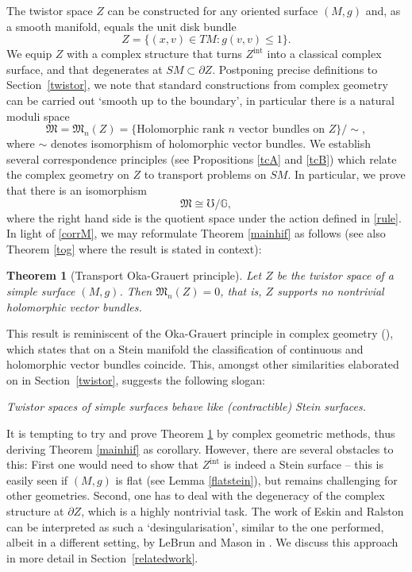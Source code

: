 \documentclass[JEP,XML,SOM,Unicode,published]{cedram}
\theoremstyle{plain}
\newtheorem{theorem}{Theorem}[section]
\theoremstyle{definition}
\newcommand{\G}{\mathbb{G}}
\newcommand{\M}{\mathfrak{M}}
\newcommand{\interior}{\mathrm{int}}
\newcommand{\1}{{\bf 1}}
\begin{document}
The twistor space $Z$ can be constructed for any oriented surface $(M,g)$ and, as a smooth manifold, equals the unit disk bundle
\begin{equation*}
Z=\{(x,v)\in TM:g(v,v)\le 1\}.
\end{equation*}
We equip $Z$ with a complex structure that turns $Z^{\interior}$ into a classical complex surface, and that degenerates at $SM\subset \partial Z$.
Postponing precise definitions to Section~\ref{twistor}, we note that standard constructions from complex geometry can be carried out `smooth up to the boundary', in particular there is a natural moduli space
\begin{equation*}
\M=\M_n(Z)=\{\text{Holomorphic rank } n \text{ vector bundles on } Z\}/\sim,
\end{equation*}
where $\sim$ denotes isomorphism of holomorphic vector bundles. We establish several correspondence principles (see Propositions \ref{tcA} and \ref{tcB}) which relate the complex geometry on $Z$ to transport problems on $SM$. In particular, we prove that there is an isomorphism
\begin{equation}\label{corrM}
\M \cong \mho / \G,
\end{equation}
where the right hand side is the quotient space under the action defined in \eqref{rule}. In light of \eqref{corrM}, we may reformulate Theorem \ref{mainhif} as follows (see also Theorem \ref{tog} where the result is stated in context):

\begin{theorem}[Transport Oka-Grauert principle]\label{maintog} Let $Z$ be the twistor space of a simple surface $(M,g)$. Then $\M_n(Z)=0$, that is, $Z$ supports no nontrivial holomorphic vector bundles.
\end{theorem}

This result is reminiscent of the Oka-Grauert principle in complex geometry (\cf \cite{Gra58,For11}), which states that on a Stein manifold the classification of continuous and holomorphic vector bundles coincide. This, amongst other similarities elaborated on in Section~\ref{twistor}, suggests the following slogan:
\begin{center}
\emph{Twistor spaces of simple surfaces behave like (contractible) Stein surfaces.}
\end{center}
It is tempting to try and prove Theorem \ref{maintog} by complex geometric methods, thus deriving Theorem \ref{mainhif} as corollary. However, there are several obstacles to this: First one would need to show that $Z^\interior$ is indeed a Stein surface -- this is easily seen if $(M,g)$ is flat (see Lemma \ref{flatstein}), but remains challenging for other geometries. Second, one has to deal with the degeneracy of the complex structure at $\partial Z$, which is a highly nontrivial task. The work of
Eskin and Ralston \cite{EsRa04} can be interpreted as such a `desingularisation', similar to the one performed, albeit in a different setting, by LeBrun and Mason in \cite{LeMa02}. We discuss this approach in more detail in Section~\ref{relatedwork}.
\end{document}
